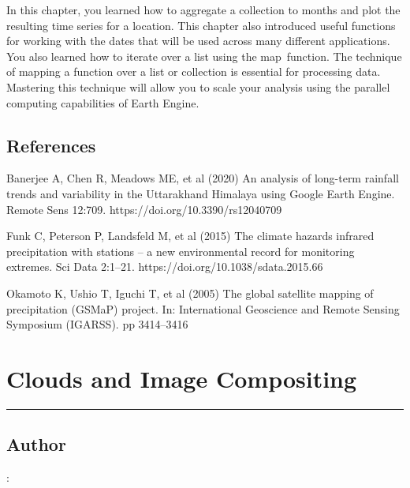 \documentclass[
  letterpaper,
  DIV=11,
  numbers=noendperiod]{scrreprt}
\begin{document}

In this chapter, you learned how to aggregate a collection to months and
plot the resulting time series for a location. This chapter also
introduced useful functions for working with the dates that will be used
across many different applications. You also learned how to iterate over
a list using the map~function. The technique of mapping a function over
a list or collection is essential for processing data. Mastering this
technique will allow you to scale your analysis using the parallel
computing capabilities of Earth Engine.

\hypertarget{references-5}{%
\section*{References}\label{references-5}}


Banerjee A, Chen R, Meadows ME, et al (2020) An analysis of long-term
rainfall trends and variability in the Uttarakhand Himalaya using Google
Earth Engine. Remote Sens 12:709. https://doi.org/10.3390/rs12040709

Funk C, Peterson P, Landsfeld M, et al (2015) The climate hazards
infrared precipitation with stations -- a new environmental record for
monitoring extremes. Sci Data 2:1--21.
https://doi.org/10.1038/sdata.2015.66

Okamoto K, Ushio T, Iguchi T, et al (2005) The global satellite mapping
of precipitation (GSMaP) project. In: International Geoscience and
Remote Sensing Symposium (IGARSS). pp 3414--3416

\hypertarget{clouds-and-image-compositing}{%
\chapter{Clouds and Image
Compositing}\label{clouds-and-image-compositing}}

\begin{center}\rule{0.5\linewidth}{0.5pt}\end{center}

\hypertarget{author-8}{%
\section*{Author}\label{author-8}}


:
\end{document}
